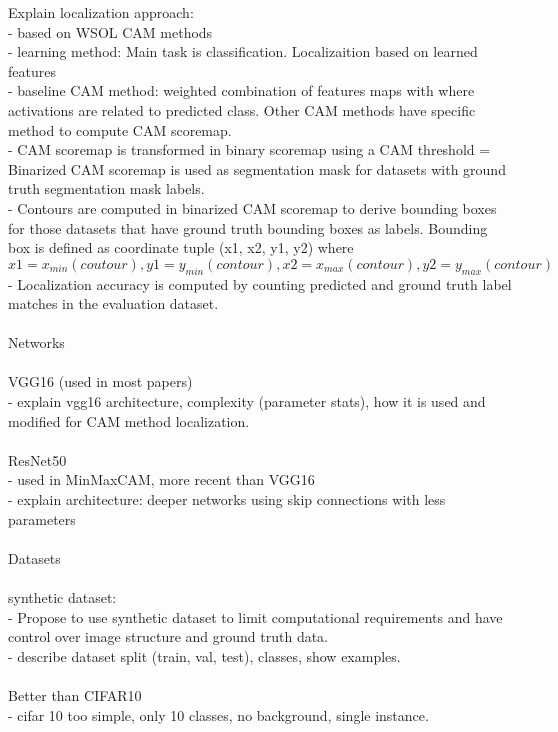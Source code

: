 Explain localization approach:\\
- based on WSOL CAM methods\\
- learning method: Main task is classification. Localizaition based on learned features\\
- baseline CAM method: weighted combination of features maps with where activations are related to predicted class. Other CAM methods have specific method to compute CAM scoremap.\\
- CAM scoremap is transformed in binary scoremap using a CAM threshold
= Binarized CAM scoremap is used as segmentation mask for datasets with ground truth segmentation mask labels.\\
- Contours are computed in binarized CAM scoremap to derive bounding boxes for those datasets that have ground truth bounding boxes as labels. Bounding box is defined as coordinate tuple (x1, x2, y1, y2) where $x1 = x_{min}(coutour), y1 = y_{min}(contour), x2 = x_{max}(contour), y2 = y_{max}(contour)$\\
- Localization accuracy is computed by counting predicted and ground truth label matches in the evaluation dataset.\\
\\
Networks\\
\\
VGG16 (used in most papers)\\
- explain vgg16 architecture, complexity (parameter stats), how it is used and modified for 
CAM method localization.\\
\\
ResNet50 \\
- used in MinMaxCAM, more recent than VGG16\\
- explain architecture: deeper networks using skip connections with less parameters\\
\\
Datasets\\
\\
synthetic dataset:\\
- Propose to use synthetic dataset to limit computational requirements and have control over image structure and ground truth data.\\
- describe dataset split (train, val, test), classes, show examples.\\
\\
Better than CIFAR10\\
- cifar 10 too simple, only 10 classes, no background, single instance.\\
